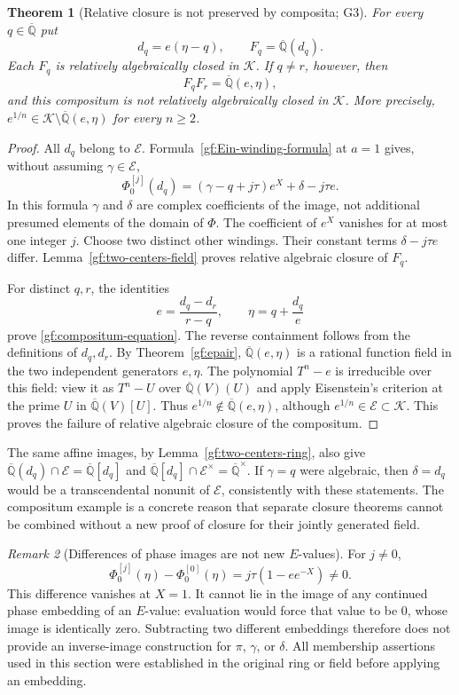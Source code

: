 \documentclass[11pt,a4paper]{article}
\numberwithin{equation}{section}
\newtheorem{theorem}{Theorem}[section]
\theoremstyle{definition}
\theoremstyle{remark}
\newtheorem{remark}[theorem]{Remark}
\newcommand{\A}{\overline{\mathbb Q}}
\newcommand{\Er}{\mathcal E}
\newcommand{\K}{\mathcal K}
\begin{document}
\begin{theorem}[Relative closure is not preserved by composita; G3]
\label{gf:compositum}
For every $q\in\A$ put
\[
 d_q=e(\eta-q),\qquad F_q=\A(d_q).
\]
Each $F_q$ is relatively algebraically closed in $\K$.  If $q\ne r$,
however, then
\begin{equation}\label{gf:compositum-equation}
 F_qF_r=\A(e,\eta),
\end{equation}
and this compositum is not relatively algebraically closed in $\K$.
More precisely, $e^{1/n}\in\K\setminus\A(e,\eta)$ for every $n\ge2$.
\end{theorem}
\begin{proof}
All $d_q$ belong to $\Er$.  Formula~\eqref{gf:Ein-winding-formula}
at $a=1$ gives, without assuming $\gamma\in\Er$,
\begin{equation}\label{gf:dq-images}
 \Phi_0^{[j]}(d_q)
   =(\gamma-q+j\tau)e^X+\delta-j\tau e.
\end{equation}
In this formula $\gamma$ and $\delta$ are complex coefficients of
the image, not additional presumed elements of the domain of $\Phi$.
The coefficient of $e^X$ vanishes for at most one integer $j$.
Choose two distinct other windings.  Their constant terms
$\delta-j\tau e$ differ.  Lemma~\ref{gf:two-centers-field} proves
relative algebraic closure of $F_q$.

For distinct $q,r$, the identities
\[
 e=\frac{d_q-d_r}{r-q},\qquad
 \eta=q+\frac{d_q}{e}
\]
prove \eqref{gf:compositum-equation}.  The reverse containment follows
from the definitions of $d_q,d_r$.
By Theorem~\ref{gf:epair}, $\A(e,\eta)$ is a rational function field
in the two independent generators $e,\eta$.  The polynomial
$T^n-e$ is irreducible over this field: view it as $T^n-U$ over
$\A(V)(U)$ and apply Eisenstein's criterion at the prime $U$ in
$\A(V)[U]$.  Thus $e^{1/n}\notin\A(e,\eta)$, although
$e^{1/n}\in\Er\subset\K$.  This proves the failure of relative
algebraic closure of the compositum.
\end{proof}

The same affine images, by Lemma~\ref{gf:two-centers-ring}, also give
$\A(d_q)\cap\Er=\A[d_q]$ and
$\A[d_q]\cap\Er^\times=\A^\times$.
If $\gamma=q$ were algebraic, then $\delta=d_q$ would be a
transcendental nonunit of $\Er$, consistently with these statements.
The compositum example is a concrete reason that separate closure
theorems cannot be combined without a new proof of closure for their
jointly generated field.

\begin{remark}[Differences of phase images are not new $E$-values]
\label{gf:no-pullback}
For $j\ne0$,
\[
 \Phi_0^{[j]}(\eta)-\Phi_0^{[0]}(\eta)
     =j\tau(1-e e^{-X})\ne0.
\]
This difference vanishes at $X=1$.  It cannot lie in the image of any
continued phase embedding of an $E$-value: evaluation would force
that value to be $0$, whose image is identically zero.  Subtracting
two different embeddings therefore does not provide an inverse-image
construction for $\pi$, $\gamma$, or $\delta$.  All membership
assertions used in this section were established in the original
ring or field before applying an embedding.
\end{remark}
\end{document}
